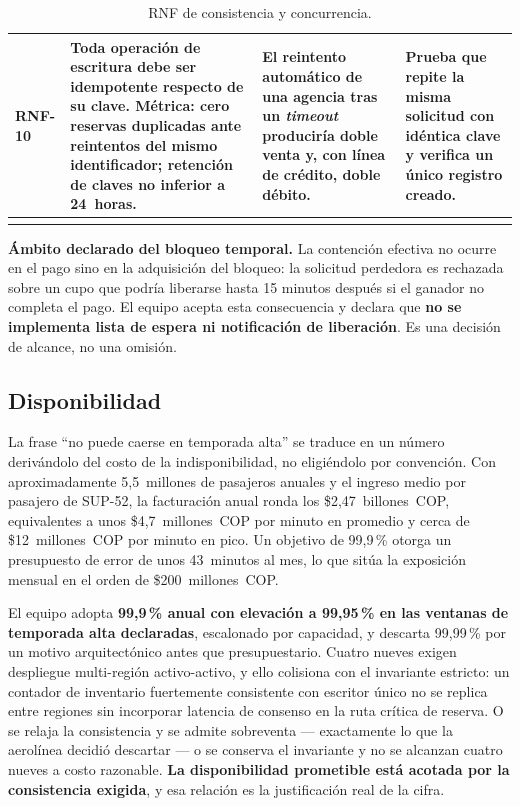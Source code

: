 \documentclass[10pt,letterpaper]{article}
\newcommand{\nota}[1]{%
  \begin{tcolorbox}[colback=cajaFondo,colframe=usaAzul!60,sharp corners=south]#1\end{tcolorbox}}
\begin{document}
\begin{longtable}{@{}L{1.5cm} L{5.0cm} L{4.6cm} L{4.9cm}@{}}
RNF-10 & Toda operación de escritura debe ser idempotente respecto de su clave. Métrica: cero reservas duplicadas ante reintentos del mismo identificador; retención de claves no inferior a 24~horas. & El reintento automático de una agencia tras un \emph{timeout} produciría doble venta y, con línea de crédito, doble débito. & Prueba que repite la misma solicitud con idéntica clave y verifica un único registro creado. \\
\bottomrule
\caption{RNF de consistencia y concurrencia.}
\end{longtable}

\nota{\textbf{Ámbito declarado del bloqueo temporal.} La contención efectiva no ocurre en el pago sino en la adquisición del bloqueo: la solicitud perdedora es rechazada sobre un cupo que podría liberarse hasta 15 minutos después si el ganador no completa el pago. El equipo acepta esta consecuencia y declara que \textbf{no se implementa lista de espera ni notificación de liberación}. Es una decisión de alcance, no una omisión.}

\subsection{Disponibilidad}
La frase ``no puede caerse en temporada alta'' se traduce en un número derivándolo del costo de la indisponibilidad, no eligiéndolo por convención. Con aproximadamente 5{,}5~millones de pasajeros anuales y el ingreso medio por pasajero de SUP-52, la facturación anual ronda los \$2{,}47~billones~COP, equivalentes a unos \$4{,}7~millones~COP por minuto en promedio y cerca de \$12~millones~COP por minuto en pico. Un objetivo de 99{,}9\,\% otorga un presupuesto de error de unos 43~minutos al mes, lo que sitúa la exposición mensual en el orden de \$200~millones~COP.

El equipo adopta \textbf{99{,}9\,\% anual con elevación a 99{,}95\,\% en las ventanas de temporada alta declaradas}, escalonado por capacidad, y descarta 99{,}99\,\% por un motivo arquitectónico antes que presupuestario. Cuatro nueves exigen despliegue multi-región activo-activo, y ello colisiona con el invariante estricto: un contador de inventario fuertemente consistente con escritor único no se replica entre regiones sin incorporar latencia de consenso en la ruta crítica de reserva. O se relaja la consistencia y se admite sobreventa --- exactamente lo que la aerolínea decidió descartar --- o se conserva el invariante y no se alcanzan cuatro nueves a costo razonable. \textbf{La disponibilidad prometible está acotada por la consistencia exigida}, y esa relación es la justificación real de la cifra.
\end{document}
